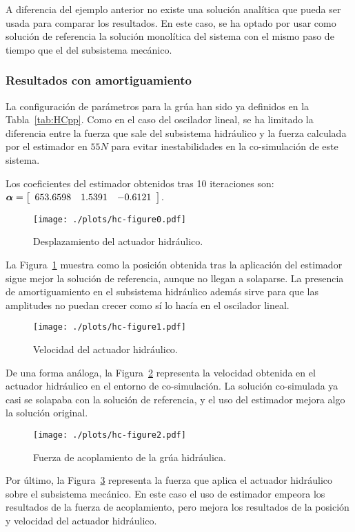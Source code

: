 A diferencia del ejemplo anterior no existe una solución analítica que pueda ser usada para comparar los resultados.
En este caso, se ha optado por usar como solución de referencia la solución monolítica del sistema con el mismo paso de tiempo que el del subsistema mecánico.

\subsubsection{Resultados con amortiguamiento}
\label{subsec:res_grua}

La configuración de parámetros para la grúa han sido ya definidos en la Tabla~\ref{tab:HCpp}.
Como en el caso del oscilador lineal, se ha limitado la diferencia entre la fuerza que sale del subsistema hidráulico y la fuerza calculada por el estimador en $55\unit{N}$ para evitar inestabilidades en la co-simulación de este sistema.


Los coeficientes del estimador obtenidos tras 10 iteraciones son:
$\coefficients = \sqbr{\matr{ccc}{653.6598 & 1.5391 & -0.6121}}$.


\begin{figure}[ht!]\centering
	\texttt{[image: ./plots/hc-figure0.pdf]}
	\caption{Desplazamiento del actuador hidráulico.}
	\label{fig:GruaPos}
\end{figure}

La Figura~\ref{fig:GruaPos} muestra como la posición obtenida tras la aplicación del estimador sigue mejor la solución de referencia, aunque no llegan a solaparse.
La presencia de amortiguamiento en el subsistema hidráulico además sirve para que las amplitudes no puedan crecer como sí lo hacía en el oscilador lineal.


\begin{figure}[ht!]\centering
	\texttt{[image: ./plots/hc-figure1.pdf]}
	\caption{Velocidad del actuador hidráulico.}
	\label{fig:GruaVel}
\end{figure}

De una forma análoga, la Figura~\ref{fig:GruaVel} representa la velocidad obtenida en el actuador hidráulico en el entorno de co-simulación.
La solución co-simulada ya casi se solapaba con la solución de referencia, y el uso del estimador mejora algo la solución original.

\begin{figure}[ht!]\centering
	\texttt{[image: ./plots/hc-figure2.pdf]}
	\caption{Fuerza de acoplamiento de la grúa hidráulica.}
	\label{fig:GruaFor}
\end{figure}

Por último, la Figura~\ref{fig:GruaFor} representa la fuerza que aplica el actuador hidráulico sobre el subsistema mecánico.
En este caso el uso de estimador empeora los resultados de la fuerza de acoplamiento, pero mejora los resultados de la posición y velocidad del actuador hidráulico.


